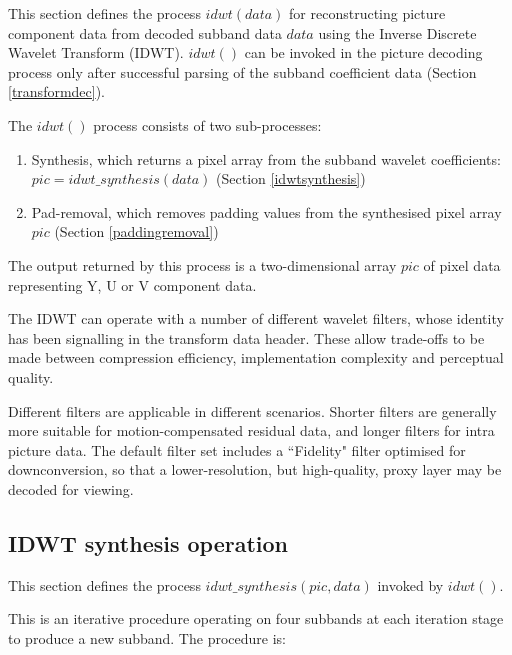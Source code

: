 
\label{idwt}

This section defines the process $idwt(data)$ for reconstructing picture component data
from decoded subband data $data$ using the Inverse Discrete Wavelet Transform (IDWT). $idwt()$
can be invoked in the picture decoding process only after successful parsing of the
subband coefficient data (Section \ref{transformdec}).

The $idwt()$ process consists of two sub-processes:

\begin{enumerate}
\item Synthesis, which returns a pixel array from the subband wavelet
coefficients: $pic=idwt\_synthesis(data)$ (Section \ref{idwtsynthesis})
\item Pad-removal, which removes padding values from the synthesised pixel array $pic$ (Section \ref{paddingremoval})
\end{enumerate}

The output returned by this process is a two-dimensional array $pic$ of pixel data representing
Y, U or V component data.

\begin{informative}
The IDWT can operate with a number of different wavelet filters, whose identity has
been signalling in the transform data header. These allow trade-offs to be made
between compression efficiency, implementation complexity and perceptual quality.

Different filters are applicable in different scenarios. Shorter filters are generally more
suitable for motion-compensated residual data, and longer filters for intra picture data.
The default filter set includes a ``Fidelity" filter optimised for downconversion, so that a lower-resolution,
but high-quality, proxy layer may be decoded for viewing.
\end{informative}

\subsection{IDWT synthesis operation}

This section defines the process $idwt\_synthesis(pic, data)$ invoked by $idwt()$.

This is an iterative procedure operating on four subbands at each
iteration stage to produce a new subband. The procedure
is:

